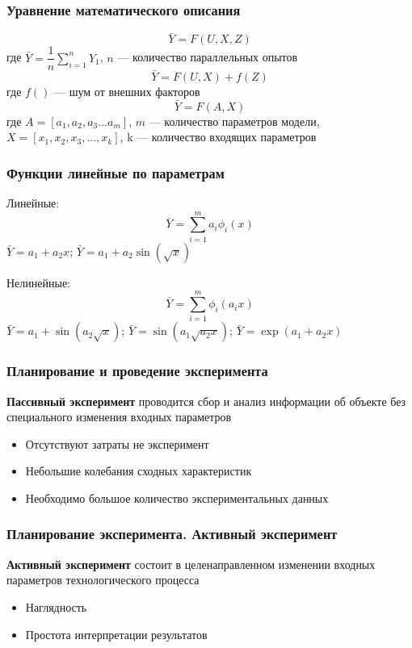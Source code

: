 \begin{frame}
	\frametitle{Уравнение математического описания}
	\begin{equation}
		\bar{Y}=F(U,X,Z)
	\end{equation}
	где $\bar{Y}=\dfrac{1}{n} \sum_{i=1}^n Y_1$, $n$ --- количество параллельных опытов
	\begin{equation}
	\bar{Y}=F(U,X)+f(Z)
	\end{equation}
	где $f()$ --- шум от внешних факторов
	\begin{equation}
	\bar{Y}=F(A,X)
	\end{equation}
	где $A=[a_1,a_2,a_3...a_m]$, $m$ --- количество параметров модели, $X=[x_1,x_2,x_3,..., x_k]$, k ---  количество входящих параметров
\end{frame}
\begin{frame}
	\frametitle{Функции линейные по параметрам}
	Линейные:
	\begin{equation}
	\bar{Y}=\sum_{i=1}^m a_i \phi_i(x)
	\end{equation}
	$\bar{Y}=a_1 +a_2 x$; $\bar{Y}=a_1 +a_2 \sin(\sqrt{x})$
	
	Нелинейные:
	\begin{equation}
	\bar{Y}=\sum_{i=1}^m \phi_i( a_i x)
	\end{equation}
	$\bar{Y}=a_1 +\sin(a_2 \sqrt{x})$; $\bar{Y}=\sin(a_1\sqrt{a_2 x})$;
	$\bar{Y}=\exp(a_1+a_2 x)$
\end{frame}

\begin{frame}
	\frametitle{Планирование и проведение эксперимента}
	\textbf{Пассивный эксперимент} проводится сбор и анализ информации об объекте без специального изменения входных параметров
	\begin{itemize}
		\item Отсутствуют затраты не эксперимент
		\item Небольшие колебания сходных характеристик
		\item Необходимо большое количество экспериментальных данных
	\end{itemize}
	
\end{frame}


\begin{frame}
	\frametitle{Планирование эксперимента. Активный эксперимент}
	\textbf{Активный эксперимент} состоит в целенаправленном изменении входных параметров технологического процесса
	\begin{itemize}
		\item Наглядность
		\item Простота интерпретации результатов
	\end{itemize}
	
\end{frame}

